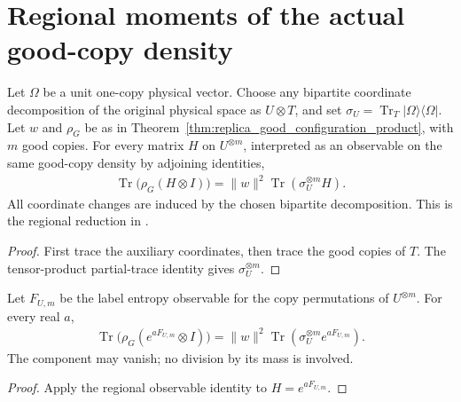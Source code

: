 \section{Regional moments of the actual good-copy density}
\label{sec:replica_good_configuration_regional_moment}

\begin{theorem}
\label{thm:replica_good_configuration_regional_expectation}
\leanok
Let $\Omega$ be a unit one-copy physical vector.
Choose any bipartite coordinate decomposition of the original physical
space as $U\otimes T$, and set
$\sigma_U=\operatorname{Tr}_T|\Omega\rangle\langle\Omega|$.
Let $w$ and $\rho_G$ be as in
Theorem~\ref{thm:replica_good_configuration_product}, with $m$ good
copies. For every matrix $H$ on $U^{\otimes m}$, interpreted as an
observable on the same good-copy density by adjoining identities,
\begin{align*}
 \operatorname{Tr}\bigl(\rho_G(H\otimes I)\bigr)
 =\|w\|^2\operatorname{Tr}(\sigma_U^{\otimes m}H).
\end{align*}
All coordinate changes are induced by the chosen bipartite decomposition.
This is the regional reduction in
\cite[Section~8, lines~550--560]{OpenAI2026AreaLaw}.
\end{theorem}
\begin{proof}
\leanok
{}
First trace the auxiliary coordinates, then trace the good copies of
$T$. The tensor-product partial-trace identity gives
$\sigma_U^{\otimes m}$.
\end{proof}

\begin{theorem}
\label{thm:replica_good_configuration_regional_label_moment}
\leanok
Let $F_{U,m}$ be the label entropy observable for the copy permutations
of $U^{\otimes m}$. For every real $a$,
\begin{align*}
 \operatorname{Tr}\bigl(\rho_G(e^{aF_{U,m}}\otimes I)\bigr)
 =\|w\|^2\operatorname{Tr}(\sigma_U^{\otimes m}e^{aF_{U,m}}).
\end{align*}
The component may vanish; no division by its mass is involved.
\end{theorem}
\begin{proof}
\leanok
{}
Apply the regional observable identity to $H=e^{aF_{U,m}}$.
\end{proof}
